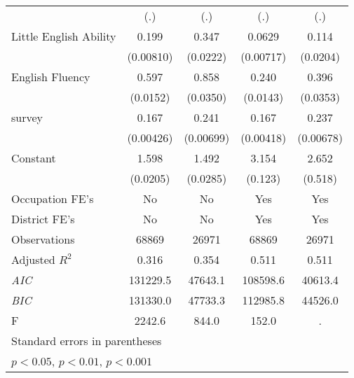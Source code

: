 \begin{table}[htbp]
\begin{tabular}{l*{4}{c}}
                &      (.)         &      (.)         &      (.)         &      (.)         \\
[1em]
Little English Ability&    0.199\sym{***}&    0.347\sym{***}&   0.0629\sym{***}&    0.114\sym{***}\\
                &(0.00810)         & (0.0222)         &(0.00717)         & (0.0204)         \\
[1em]
English Fluency &    0.597\sym{***}&    0.858\sym{***}&    0.240\sym{***}&    0.396\sym{***}\\
                & (0.0152)         & (0.0350)         & (0.0143)         & (0.0353)         \\
[1em]
survey          &    0.167\sym{***}&    0.241\sym{***}&    0.167\sym{***}&    0.237\sym{***}\\
                &(0.00426)         &(0.00699)         &(0.00418)         &(0.00678)         \\
[1em]
Constant        &    1.598\sym{***}&    1.492\sym{***}&    3.154\sym{***}&    2.652\sym{***}\\
                & (0.0205)         & (0.0285)         &  (0.123)         &  (0.518)         \\
[1em]
Occupation FE's &       No         &       No         &      Yes         &      Yes         \\
[1em]
District FE's   &       No         &       No         &      Yes         &      Yes         \\
\hline
Observations    &    68869         &    26971         &    68869         &    26971         \\
Adjusted \(R^{2}\)&    0.316         &    0.354         &    0.511         &    0.511         \\
\textit{AIC}    & 131229.5         &  47643.1         & 108598.6         &  40613.4         \\
\textit{BIC}    & 131330.0         &  47733.3         & 112985.8         &  44526.0         \\
F               &   2242.6         &    844.0         &    152.0         &        .         \\
\hline\hline
\multicolumn{5}{l}{\footnotesize Standard errors in parentheses}\\
\multicolumn{5}{l}{\footnotesize \sym{*} \(p<0.05\), \sym{**} \(p<0.01\), \sym{***} \(p<0.001\)}\\
\end{tabular}
\end{table}
